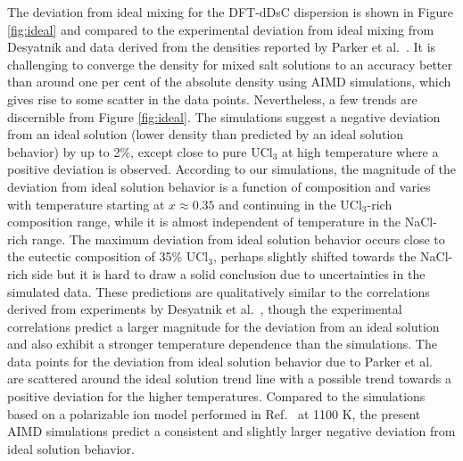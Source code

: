 \documentclass[preprint,3p,10pt,onecolumn,number,sort&compress]{elsarticle}
\begin{document}
{The deviation from ideal mixing for the DFT-dDsC dispersion is shown in Figure \ref{fig:ideal} and compared to the experimental deviation from ideal mixing from Desyatnik \cite{Desyatnik} and data derived from the densities reported by Parker et al.~\cite{Parker}. %
It is challenging to converge the density for mixed salt solutions to an accuracy better than around one per cent of the absolute density using AIMD simulations, which gives rise to some scatter in the data points. Nevertheless, a few trends are discernible from Figure \ref{fig:ideal}. The simulations suggest a negative deviation from an ideal solution (lower density than predicted by an ideal solution behavior) by up to 2\%, except close to pure UCl$_3$ at high temperature where a positive deviation is observed. According to our simulations, the magnitude of the deviation from ideal solution behavior is a function of composition and varies with temperature starting at $x\approx0.35$ and continuing in the UCl$_3$-rich composition range, while it is almost independent of temperature in the NaCl-rich range. 
The maximum deviation from ideal solution behavior occurs close to the eutectic composition of 35\% UCl$_3$, perhaps slightly shifted towards the NaCl-rich side but it is hard to draw a solid conclusion due to uncertainties in the simulated data. These predictions are qualitatively similar to the correlations derived from experiments by Desyatnik et al.~\cite{Desyatnik}, though the experimental correlations predict a larger magnitude for the deviation from an ideal solution and also exhibit a stronger temperature dependence than the simulations. The data points for the deviation from ideal solution behavior due to Parker et al.~\cite{Parker} are scattered around the ideal solution trend line with a possible trend towards a positive deviation for the higher temperatures.
Compared to the simulations based on a polarizable ion model performed in Ref.~\cite{VANOUDENAREN2021117470} at 1100 K, the present AIMD simulations predict a consistent and slightly larger negative deviation from ideal solution behavior.

}
\end{document}
